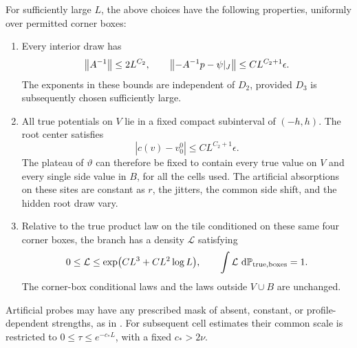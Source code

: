 \begin{proposition}\label{cell:branch}
For sufficiently large $L$, the above choices have the following
properties, uniformly over permitted corner boxes:
\begin{enumerate}[label=(\roman*)]
 \item Every interior draw has
 \begin{equation}
  \left\lVert A^{-1}\right\rVert\le2L^{C_2},\qquad
  \left\lVert-A^{-1}p-\psi|_J\right\rVert\le C L^{C_2+1}\epsilon.
  \label{cell:residual}
 \end{equation}
 The exponents in these bounds are independent of $D_2$, provided $D_3$
 is subsequently chosen sufficiently large.
 \item All true potentials on $V$ lie in a fixed compact subinterval
 of $(-h,h)$.  The root center satisfies
 \begin{equation}
  |c(v)-v_0^0|\le C L^{C_2+1}\epsilon.
  \label{cell:root-calibration}
 \end{equation}
 The plateau of $\vartheta$ can therefore be fixed to contain every
 true value on $V$ and every single side value in $B$, for all the cells
 used.  The artificial absorptions on these sites are constant as
 $r$, the jitters, the common side shift, and the hidden root draw vary.
 \item Relative to the true product law on the tile conditioned on
 these same four corner boxes, the branch has a density
 $\mathcal L$ satisfying
 \begin{equation}
  0\le\mathcal L\le
       \exp\bigl(C L^3+C L^2\log L\bigr),
  \qquad \int\mathcal L\,\,\mathrm d\mathbb P_{\rm true,boxes}=1.
  \label{cell:likelihood}
 \end{equation}
 The corner-box conditional laws and the laws outside $V\cup B$ are
 unchanged.
\end{enumerate}
Artificial probes may have any prescribed mask of absent, constant, or
profile-dependent strengths, as in .  For subsequent cell
estimates their common scale is restricted to
$0\le\tau\le e^{-c_*L}$, with a fixed $c_*>2\nu$.
\end{proposition}

